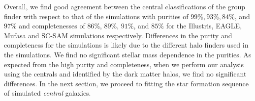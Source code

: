 \documentclass[tighten, preprint]{aastex62}
\begin{document}
Overall, we find good agreement between the central classifications of 
{\color{red}
the group finder with respect to that of the simulations %
 with purities of}
$99\%, 93\%, 84\%$, and $97\%$ and completenesses of $86\%$, $89\%$, 
$91\%$, and $85\%$ for the Illustris, EAGLE, {\sc Mufasa} and SC-SAM 
simulations respectively. Differences in the purity and completeness for the 
simulations is likely due to the different halo finders used in the 
simulations. %
We find no significant stellar mass dependence in the purities. %
As expected from the high purity and completeness, when we perform our 
analysis using the centrals and identified by the dark matter halos, we 
find no significant differences. %
In the next section, we proceed to fitting the star formation sequence 
of simulated \emph{central} galaxies. %
\end{document}
